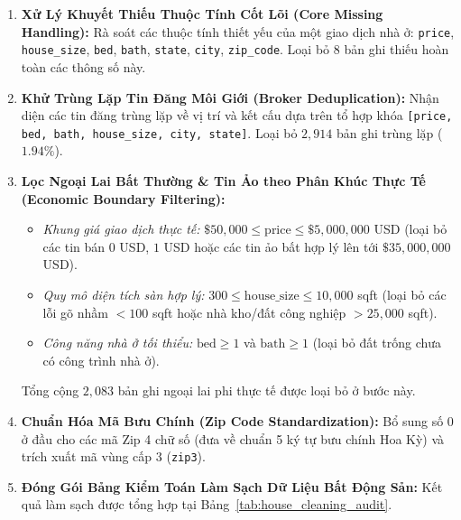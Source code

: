 \documentclass[12pt,a4paper]{report}
\begin{document}
\begin{enumerate}[leftmargin=2em]
    \item \textbf{Xử Lý Khuyết Thiếu Thuộc Tính Cốt Lõi (Core Missing Handling):} Rà soát các thuộc tính thiết yếu của một giao dịch nhà ở: \texttt{price}, \texttt{house\_size}, \texttt{bed}, \texttt{bath}, \texttt{state}, \texttt{city}, \texttt{zip\_code}. Loại bỏ $8$ bản ghi thiếu hoàn toàn các thông số này.
    \item \textbf{Khử Trùng Lặp Tin Đăng Môi Giới (Broker Deduplication):} Nhận diện các tin đăng trùng lặp về vị trí và kết cấu dựa trên tổ hợp khóa \texttt{[price, bed, bath, house\_size, city, state]}. Loại bỏ $2,914$ bản ghi trùng lặp ($1.94\%$).
    \item \textbf{Lọc Ngoại Lai Bất Thường \& Tin Ảo theo Phân Khúc Thực Tế (Economic Boundary Filtering):}
    \begin{itemize}
        \item \textit{Khung giá giao dịch thực tế:} $\$50,000 \le \text{price} \le \$5,000,000$ USD (loại bỏ các tin bán $0$ USD, $1$ USD hoặc các tin ảo bất hợp lý lên tới $\$35,000,000$ USD).
        \item \textit{Quy mô diện tích sàn hợp lý:} $300 \le \text{house\_size} \le 10,000$ sqft (loại bỏ các lỗi gõ nhầm $< 100$ sqft hoặc nhà kho/đất công nghiệp $> 25,000$ sqft).
        \item \textit{Công năng nhà ở tối thiểu:} $\text{bed} \ge 1$ và $\text{bath} \ge 1$ (loại bỏ đất trống chưa có công trình nhà ở).
    \end{itemize}
    Tổng cộng $2,083$ bản ghi ngoại lai phi thực tế được loại bỏ ở bước này.
    \item \textbf{Chuẩn Hóa Mã Bưu Chính (Zip Code Standardization):} Bổ sung số 0 ở đầu cho các mã Zip 4 chữ số (đưa về chuẩn 5 ký tự bưu chính Hoa Kỳ) và trích xuất mã vùng cấp 3 (\texttt{zip3}).
    \item \textbf{Đóng Gói Bảng Kiểm Toán Làm Sạch Dữ Liệu Bất Động Sản:} Kết quả làm sạch được tổng hợp tại Bảng~\ref{tab:house_cleaning_audit}.
\end{enumerate}
\end{document}
